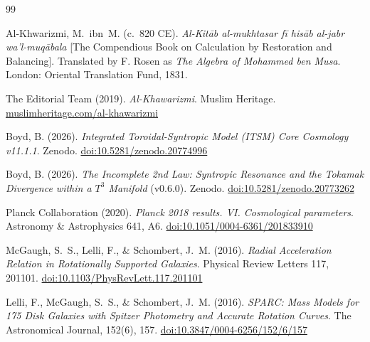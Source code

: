 \documentclass[aps,prd,11pt,onecolumn,superscriptaddress,nofootinbib,floatfix]{revtex4-2}
\begin{document}
\begin{thebibliography}{99}

Al-Khwarizmi, M.~ibn~M. (c.~820 CE). \textit{Al-Kit\=ab al-mukhtasar f\=i his\=ab al-jabr wa'l-muq\=abala} [The Compendious Book on Calculation by Restoration and Balancing]. Translated by F. Rosen as \textit{The Algebra of Mohammed ben Musa}. London: Oriental Translation Fund, 1831.

The Editorial Team (2019). \textit{Al-Khawarizmi}. Muslim Heritage.
\href{https://muslimheritage.com/al-khawarizmi/}{muslimheritage.com/al-khawarizmi}

Boyd, B. (2026). \textit{Integrated Toroidal-Syntropic Model (ITSM) Core Cosmology v11.1.1}. Zenodo. \href{https://doi.org/10.5281/zenodo.20774996}{doi:10.5281/zenodo.20774996}

Boyd, B. (2026). \textit{The Incomplete 2nd Law: Syntropic Resonance and the Tokamak Divergence within a $T^3$ Manifold} (v0.6.0). Zenodo. \href{https://doi.org/10.5281/zenodo.20773262}{doi:10.5281/zenodo.20773262}

Planck Collaboration (2020). \textit{Planck 2018 results. VI. Cosmological parameters}. Astronomy \& Astrophysics 641, A6. \href{https://doi.org/10.1051/0004-6361/201833910}{doi:10.1051/0004-6361/201833910}

McGaugh, S.~S., Lelli, F., \& Schombert, J.~M. (2016). \textit{Radial Acceleration Relation in Rotationally Supported Galaxies}. Physical Review Letters 117, 201101. \href{https://doi.org/10.1103/PhysRevLett.117.201101}{doi:10.1103/PhysRevLett.117.201101}

Lelli, F., McGaugh, S.~S., \& Schombert, J.~M. (2016). \textit{SPARC: Mass Models for 175 Disk Galaxies with Spitzer Photometry and Accurate Rotation Curves}. The Astronomical Journal, 152(6), 157. \href{https://doi.org/10.3847/0004-6256/152/6/157}{doi:10.3847/0004-6256/152/6/157}

\end{thebibliography}
\end{document}

